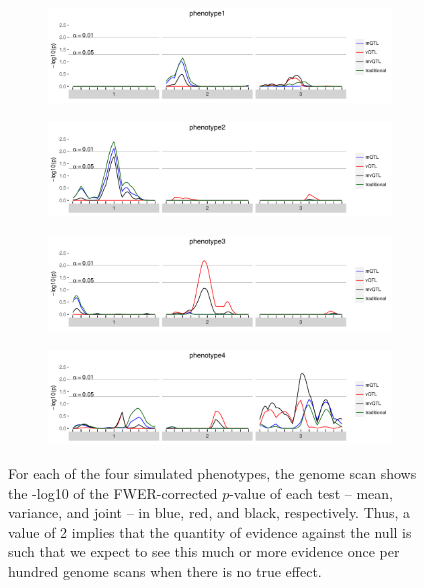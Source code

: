 \documentclass[9pt,twocolumn,twoside]{gsag3jnl}
\begin{document}
\begin{figure}[t]
    \begin{subfigure}[b]{\linewidth}
        \includegraphics[width=\textwidth]{images/empir_p_scan_phenotype1.pdf}
    \end{subfigure}

    \begin{subfigure}[b]{\linewidth}
        \includegraphics[width=\textwidth]{images/empir_p_scan_phenotype2.pdf}
    \end{subfigure}

    \begin{subfigure}[b]{\linewidth}
        \includegraphics[width=\textwidth]{images/empir_p_scan_phenotype3.pdf}
    \end{subfigure}

    \begin{subfigure}[b]{\linewidth}
        \includegraphics[width=\textwidth]{images/empir_p_scan_phenotype4.pdf}
    \end{subfigure}

    \caption{For each of the four simulated phenotypes, the genome scan shows the -log10 of the FWER-corrected $p$-value of each test -- mean, variance, and joint -- in blue, red, and black, respectively. Thus, a value of 2 implies that the quantity of evidence against the null is such that we expect to see this much or more evidence once per hundred genome scans when there is no true effect. \label{fig:empir_p_scans}}
\end{figure}
\end{document}
